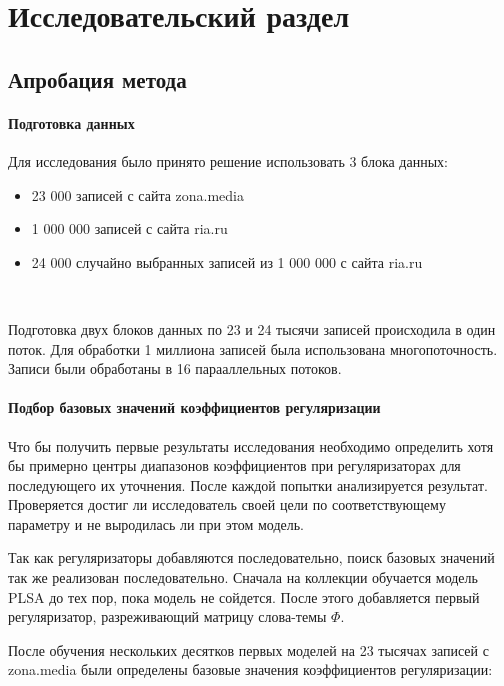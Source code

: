 \chapter{Исследовательский раздел}

%
\section{Апробация метода}

\subsubsection{Подготовка данных}

Для исследования было принято решение использовать 3 блока данных:

\begin{itemize}
    \item 23 000 записей с сайта zona.media
    \item 1 000 000 записей с сайта ria.ru
    \item 24 000 случайно выбранных записей из 1 000 000 с сайта ria.ru
\end{itemize}

~\

Подготовка двух блоков данных по 23 и 24 тысячи записей происходила в один поток. Для обработки 1 миллиона записей была использована многопоточность. Записи были обработаны в 16 парааллельных потоков.

\subsubsection{Подбор базовых значений коэффициентов регуляризации}

Что бы получить первые результаты исследования необходимо определить хотя бы примерно центры диапазонов коэффициентов при регуляризаторах для последующего их уточнения. После каждой попытки анализируется результат. Проверяется достиг ли исследователь своей цели по соответствующему параметру и не выродилась ли при этом модель.

Так как регуляризаторы добавляются последовательно, поиск базовых значений так же реализован последовательно. Сначала на коллекции обучается модель PLSA до тех пор, пока модель не сойдется. После этого добавляется первый регуляризатор, разреживающий матрицу слова-темы $\Phi$.

После обучения нескольких десятков первых моделей на 23 тысячах записей с zona.media были определены базовые значения коэффициентов регуляризации:

